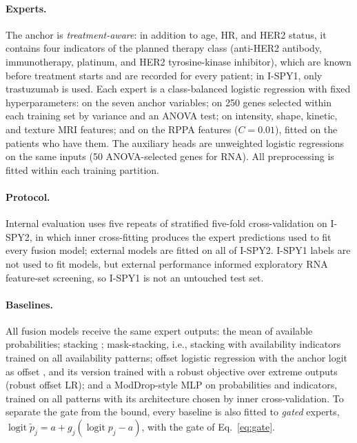 \documentclass[a4paper,runningheads]{llncs}
\newcommand{\logit}{\operatorname{logit}}
\begin{document}
\paragraph{Experts.} The anchor is \emph{treatment-aware}: in addition to age, HR, and HER2 status, it contains four indicators of the planned therapy class (anti-HER2 antibody, immunotherapy, platinum, and HER2 tyrosine-kinase inhibitor), which are known before treatment starts and are recorded for every patient; in I-SPY1, only trastuzumab is used. Each expert is a class-balanced logistic regression with fixed hyperparameters: on the seven anchor variables; on 250 genes selected within each training set by variance and an ANOVA test; on \NMriFeat{} intensity, shape, kinetic, and texture MRI features; and on the RPPA features ($C=0.01$), fitted on the patients who have them. The auxiliary heads are unweighted logistic regressions on the same inputs (50 ANOVA-selected genes for RNA). All preprocessing is fitted within each training partition.

\paragraph{Protocol.} Internal evaluation uses five repeats of stratified five-fold cross-validation on I-SPY2, in which inner cross-fitting produces the expert predictions used to fit every fusion model; external models are fitted on all of I-SPY2. I-SPY1 labels are not used to fit models, but external performance informed exploratory RNA feature-set screening, so I-SPY1 is not an untouched test set.

\paragraph{Baselines.} All fusion models receive the same expert outputs: the mean of available probabilities; stacking \cite{wolpert1992}; mask-stacking, i.e., stacking with availability indicators trained on all availability patterns; offset logistic regression with the anchor logit as offset \cite{janssen2008}, and its version trained with a robust objective over extreme outputs (robust offset LR); and a ModDrop-style MLP \cite{neverova2015} on probabilities and indicators, trained on all patterns with its architecture chosen by inner cross-validation. To separate the gate from the bound, every baseline is also fitted to \emph{gated} experts, $\logit\tilde p_j=a+g_j(\logit p_j-a)$, with the gate of Eq.~\eqref{eq:gate}.
\end{document}
